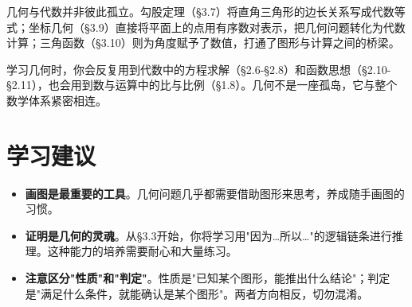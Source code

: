 几何与代数并非彼此孤立。勾股定理（§3.7）将直角三角形的边长关系写成代数等式；坐标几何（§3.9）直接将平面上的点用有序数对表示，把几何问题转化为代数计算；三角函数（§3.10）则为角度赋予了数值，打通了图形与计算之间的桥梁。

学习几何时，你会反复用到代数中的方程求解（§2.6-§2.8）和函数思想（§2.10-§2.11），也会用到数与运算中的比与比例（§1.8）。几何不是一座孤岛，它与整个数学体系紧密相连。

\section*{学习建议}


\begin{itemize}
  \item \textbf{画图是最重要的工具}。几何问题几乎都需要借助图形来思考，养成随手画图的习惯。
  \item \textbf{证明是几何的灵魂}。从§3.3开始，你将学习用"因为…所以…"的逻辑链条进行推理。这种能力的培养需要耐心和大量练习。
  \item \textbf{注意区分"性质"和"判定"}。性质是"已知某个图形，能推出什么结论"；判定是"满足什么条件，就能确认是某个图形"。两者方向相反，切勿混淆。
\end{itemize}

